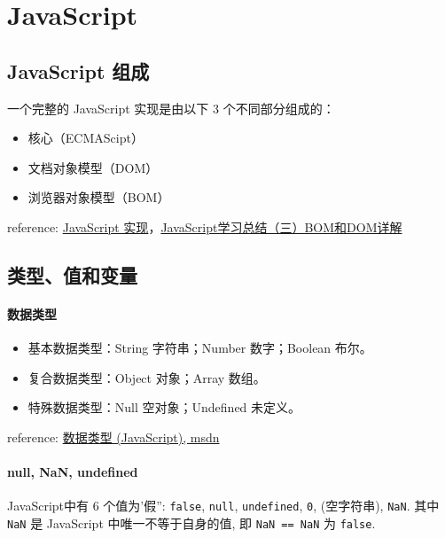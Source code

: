 \chapter{JavaScript}

\section{JavaScript 组成}\label{javascript-ux7ec4ux6210}

一个完整的 JavaScript 实现是由以下 3 个不同部分组成的：

\begin{itemize}
\tightlist
\item
  核心（ECMAScipt）
\item
  文档对象模型（DOM）
\item
  浏览器对象模型（BOM）
\end{itemize}

reference:
\href{http://www.w3school.com.cn/js/pro_js_implement.asp}{JavaScript
实现}，\href{http://segmentfault.com/a/1190000000654274}{JavaScript学习总结（三）BOM和DOM详解}

\section{类型、值和变量}\label{ux7c7bux578bux503cux548cux53d8ux91cf}

\subsubsection{数据类型}\label{ux6570ux636eux7c7bux578b}

\begin{itemize}
\tightlist
\item
  基本数据类型：String 字符串；Number 数字；Boolean 布尔。
\item
  复合数据类型：Object 对象；Array 数组。
\item
  特殊数据类型：Null 空对象；Undefined 未定义。
\end{itemize}

reference:
\href{https://msdn.microsoft.com/zh-cn/library/7wkd9z69(v=vs.94).aspx}{数据类型
(JavaScript), msdn}

\subsubsection{null, NaN, undefined}\label{null-nan-undefined}

JavaScript中有 6 个值为'假'': \texttt{false}, \texttt{null},
\texttt{undefined}, \texttt{0},
\texttt{\textquotesingle{}\textquotesingle{}}(空字符串), \texttt{NaN}.
其中 \texttt{NaN} 是 JavaScript 中唯一不等于自身的值, 即
\texttt{NaN\ ==\ NaN} 为 \texttt{false}.

